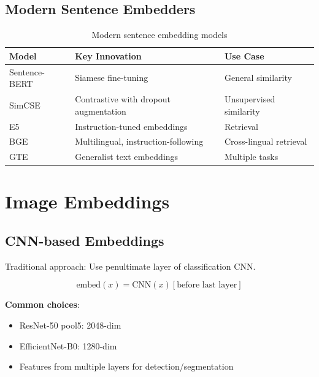 \subsection{Modern Sentence Embedders}

\begin{table}[H]
\centering
\caption{Modern sentence embedding models}
\begin{tabularx}{\textwidth}{lXX}
\toprule
\textbf{Model} & \textbf{Key Innovation} & \textbf{Use Case} \\
\midrule
Sentence-BERT & Siamese fine-tuning & General similarity \\
SimCSE & Contrastive with dropout augmentation & Unsupervised similarity \\
E5 & Instruction-tuned embeddings & Retrieval \\
BGE & Multilingual, instruction-following & Cross-lingual retrieval \\
GTE & Generalist text embeddings & Multiple tasks \\
\bottomrule
\end{tabularx}
\end{table}

\section{Image Embeddings}
\label{sec:image_embeddings}

\subsection{CNN-based Embeddings}

Traditional approach: Use penultimate layer of classification CNN.

\begin{equation}
\text{embed}(x) = \text{CNN}(x)[\text{before last layer}]
\end{equation}

\textbf{Common choices}:
\begin{itemize}
    \item ResNet-50 pool5: 2048-dim
    \item EfficientNet-B0: 1280-dim
    \item Features from multiple layers for detection/segmentation
\end{itemize}

